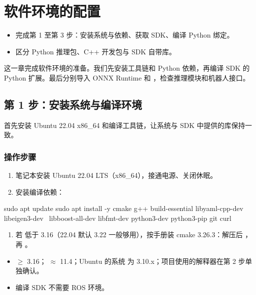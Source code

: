 \chapter{软件环境的配置}
\begin{intro}
\begin{itemize}
\item 完成第 1 至第 3 步：安装系统与依赖、获取 SDK、编译 Python 绑定。
\item 区分 Python 推理包、C++ 开发包与 SDK 自带库。
\end{itemize}
\end{intro}
这一章完成软件环境的准备。我们先安装工具链和 Python 依赖，再编译 SDK 的 Python 扩展。最后分别导入 ONNX Runtime 和 ，检查推理模块和机器人接口。

\section{第 1 步：安装系统与编译环境}
\label{step:1}
首先安装 Ubuntu 22.04 x86\_64 和编译工具链，让系统与 SDK 中提供的库保持一致。


\subsection*{操作步骤}
\begin{enumerate}
\item 笔记本安装 Ubuntu 22.04 LTS（x86\_64），接通电源、关闭休眠。
\item 安装编译依赖：

\end{enumerate}
\begin{command}
sudo apt update
sudo apt install -y cmake g++ build-essential libyaml-cpp-dev libeigen3-dev \
    libboost-all-dev libfmt-dev python3-dev python3-pip git curl
\end{command}

\begin{enumerate}[resume]
\item 若  低于 3.16（22.04 默认 3.22 一般够用），按手册装 cmake 3.26.3：解压后 ，再 。

\end{enumerate}
\begin{expected}
\begin{itemize}
\item {} $\geq$ 3.16； $\approx$ 11.4；Ubuntu 的系统  为 3.10.x；项目使用的解释器在第 2 步单独确认。
\item 编译 SDK 不需要 ROS 环境。

\end{itemize}
\end{expected}
